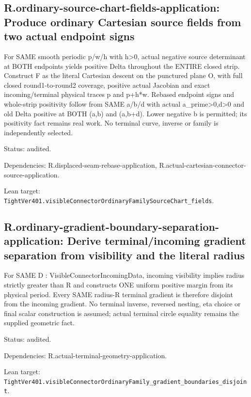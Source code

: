 \documentclass{article}
\begin{document}
\subsection*{R.ordinary-source-chart-fields-application: Produce ordinary Cartesian source fields from two actual endpoint signs}
For SAME smooth periodic p/w/h with h>0, actual negative source determinant at BOTH endpoints yields positive Delta throughout the ENTIRE closed strip. Construct F as the literal Cartesian descent on the punctured plane O, with full closed round1-to-round2 coverage, positive actual Jacobian and exact incoming/terminal physical traces p and p+h*w. Rebased endpoint signs and whole-strip positivity follow from SAME a/b/d with actual a\_prime>0,d>0 and old Delta positive at BOTH (a,b) and (a,b+d). Lower negative b is permitted; its positivity fact remains real work. No terminal curve, inverse or family is independently selected.
\par Status: audited.
\par Dependencies: R.displaced-seam-rebase-application, R.actual-cartesian-connector-source-application.
\par Lean target: \texttt{TightVer401.visibleConnectorOrdinaryFamilySourceChart\_fields}.
\subsection*{R.ordinary-gradient-boundary-separation-application: Derive terminal/incoming gradient separation from visibility and the literal radius}
For SAME D : VisibleConnectorIncomingData, incoming visibility implies radius strictly greater than R and constructs ONE uniform positive margin from its physical period. Every SAME radius-R terminal gradient is therefore disjoint from the incoming gradient. No terminal inverse, reversed nesting, eta choice or final scalar construction is assumed; actual terminal circle equality remains the supplied geometric fact.
\par Status: audited.
\par Dependencies: R.actual-terminal-geometry-application.
\par Lean target: \texttt{TightVer401.visibleConnectorOrdinaryFamily\_gradient\_boundaries\_disjoint}.
\end{document}
